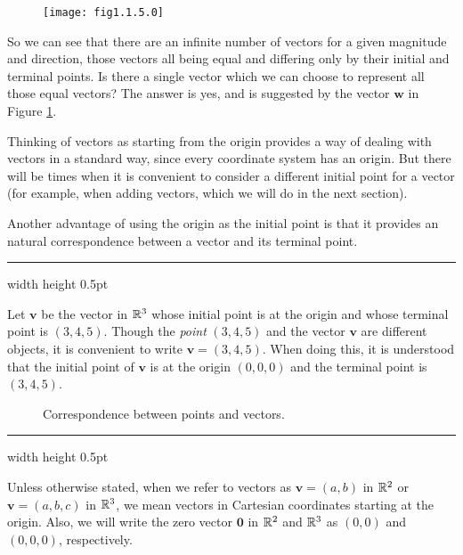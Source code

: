 \begin{figure}[h]
 \begin{center}
  \texttt{[image: fig1.1.5.0]}
 \end{center}
 \caption[]{}
 \label{fig:veceq}
\end{figure}

So we can see that there are an infinite number of vectors for a given magnitude and direction, those vectors all
being equal and differing only by their initial and terminal points.  Is there a single vector which we can choose to
represent all those equal vectors?  The answer is yes, and is suggested by the vector $\mathbf{w}$ in Figure
\ref{fig:veceq}.


\medskip
Thinking of vectors as starting from the origin provides a way of dealing with vectors in a standard way, since every
coordinate system has an origin.  But there
will be times when it is convenient to consider a different initial point for a vector (for example, when adding
vectors, which we will do in the next section).

Another advantage of using the origin as the initial point is that it provides an natural correspondence between a
vector and its terminal point.

\medskip
\hrule width \textwidth height 0.5pt
\begin{exmp}
 Let $\mathbf{v}$ be the vector in $\mathbb{R}^{3}$ whose initial point is at the origin and whose terminal point
 is $(3,4,5)$.  
 Though the \emph{point} $(3,4,5)$ and the vector $\mathbf{v}$ are different objects, it is
 convenient to write $\mathbf{v} = (3,4,5)$.  When doing this, it is understood that the initial point of $\mathbf{v}$
 is at the origin $(0,0,0)$ and the terminal point is $(3,4,5)$.
\end{exmp}

\begin{figure}[h]
 \centering
 \qquad\qquad
 \caption[]{\quad Correspondence between points and vectors.}
 \label{fig:corresp}
\end{figure}
\hrule width \textwidth height 0.5pt
\medskip

Unless otherwise stated, when we refer to vectors as $\mathbf{v} = (a,b)$ in $\mathbb{R}^{2}$ or $\mathbf{v} = (a,b,c)$
in $\mathbb{R}^{3}$, we mean vectors in Cartesian coordinates starting at the origin.  Also, we will write
the zero vector $\mathbf{0}$ in $\mathbb{R}^{2}$ and $\mathbb{R}^{3}$ as $(0,0)$ and $(0,0,0)$, respectively.

